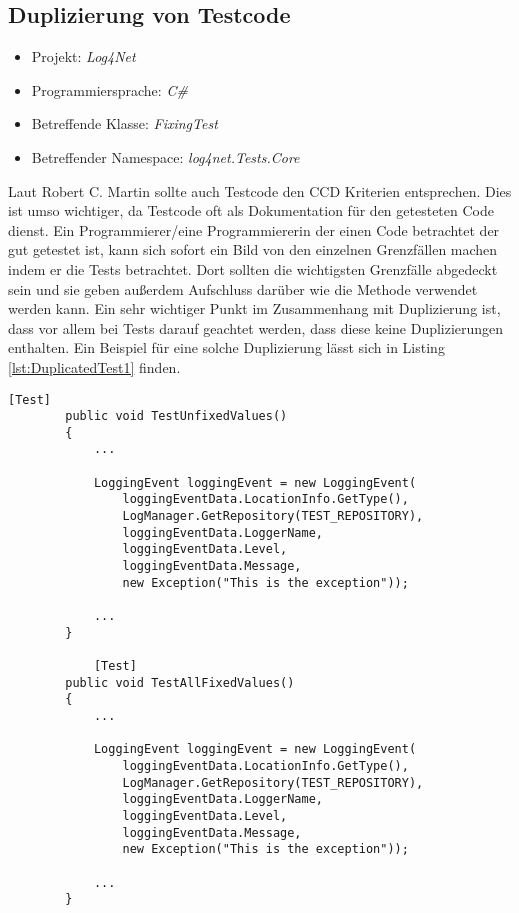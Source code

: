 \subsection{Duplizierung von Testcode}
\begin{itemize}
	\item Projekt: \textit{Log4Net}
	\item Programmiersprache: \textit{C\#}
	\item Betreffende Klasse: \textit{FixingTest}
	\item Betreffender Namespace: \textit{log4net.Tests.Core}
\end{itemize}
\SuperPar Laut Robert C. Martin sollte auch Testcode den CCD Kriterien entsprechen. Dies ist umso wichtiger, da Testcode oft als Dokumentation für den getesteten Code dienst. Ein Programmierer/eine Programmiererin der einen Code betrachtet der gut getestet ist, kann sich sofort ein Bild von den einzelnen Grenzfällen machen indem er die Tests betrachtet. Dort sollten die wichtigsten Grenzfälle abgedeckt sein und sie geben außerdem Aufschluss darüber wie die Methode verwendet werden kann. Ein sehr wichtiger Punkt im Zusammenhang mit Duplizierung ist, dass vor allem bei Tests darauf geachtet werden, dass diese keine Duplizierungen enthalten. Ein Beispiel für eine solche Duplizierung lässt sich in Listing \ref{lst:DuplicatedTest1} finden.


\begin{lstlisting}[language={[Sharp]C}, caption=Beispiele für Duplizierung in Tests, label=lst:DuplicatedTest1]
		[Test]
		public void TestUnfixedValues()
		{
			...
			
			LoggingEvent loggingEvent = new LoggingEvent(
				loggingEventData.LocationInfo.GetType(),
				LogManager.GetRepository(TEST_REPOSITORY),
				loggingEventData.LoggerName,
				loggingEventData.Level,
				loggingEventData.Message,
				new Exception("This is the exception"));
			
			...
		}
		
			[Test]
		public void TestAllFixedValues()
		{
			...
			
			LoggingEvent loggingEvent = new LoggingEvent(
				loggingEventData.LocationInfo.GetType(),
				LogManager.GetRepository(TEST_REPOSITORY),
				loggingEventData.LoggerName,
				loggingEventData.Level,
				loggingEventData.Message,
				new Exception("This is the exception"));

			...
		}
\end{lstlisting}

